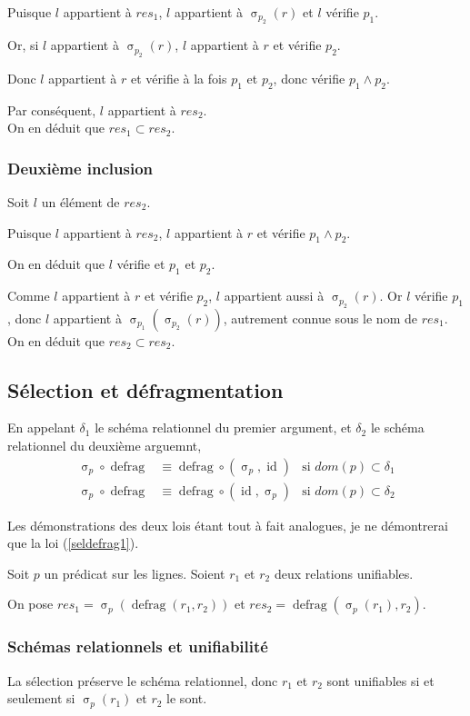 \documentclass[french]{article}
\DeclareMathOperator{\sel}{\sigma}
\DeclareMathOperator{\defrag}{defrag}
\DeclareMathOperator{\id}{id}
\newcommand{\selP}{\sel_p}
\begin{document}
Puisque $l$ appartient à $res_1$,
$l$ appartient à $\sel_{p_2}(r)$
et $l$ vérifie $p_1$.

Or, si $l$ appartient à $\sel_{p_2}(r)$,
$l$ appartient à $r$ et vérifie $p_2$.

Donc $l$ appartient à $r$ et vérifie
à la fois $p_1$ et $p_2$, donc vérifie
$p_1 \wedge p_2$.

Par conséquent, $l$
appartient à $res_2$. \\

On en déduit que $res_1 \subset res_2$.

\subsubsection*{Deuxième inclusion}
Soit $l$ un élément de $res_2$.

Puisque $l$ appartient à $res_2$,
$l$ appartient à $r$ et vérifie
$p_1 \wedge p_2$.

On en déduit que $l$ vérifie et $p_1$ et $p_2$.

Comme $l$ appartient à $r$ et vérifie $p_2$,
$l$ appartient aussi à $\sel_{p_2}(r)$.
Or $l$ vérifie $p_1$,
donc $l$ appartient à $\sel_{p_1}(\sel_{p_2}(r))$,
autrement connue sous le nom de $res_1$. \\

On en déduit que $res_2 \subset res_2$.

\subsection*{Sélection et défragmentation}
En appelant $\delta_1$ le schéma relationnel du premier argument,
et $\delta_2$ le schéma relationnel du deuxième arguemnt,
\begin{align}
\selP \circ \defrag 
& \equiv \defrag \circ (\selP, \id)
& \text{si $dom(p) \subset \delta_1$} 
\label{seldefrag1}\\
\selP \circ \defrag 
& \equiv \defrag \circ (\id, \selP)
& \text{si $dom(p) \subset \delta_2$}
\end{align}

Les démonstrations des deux lois étant tout à fait analogues,
je ne démontrerai que la loi (\ref{seldefrag1}).

Soit $p$ un prédicat sur les lignes.
Soient $r_1$ et $r_2$ deux relations unifiables.

On pose
$res_1 = \selP(\defrag(r_1, r_2))$
et
$res_2 = \defrag(\selP(r_1), r_2)$.

\subsubsection*{Schémas relationnels et unifiabilité}
La sélection préserve le schéma relationnel,
donc $r_1$ et $r_2$
sont unifiables si et seulement si
$\selP(r_1)$ et $r_2$ le sont.
\end{document}
